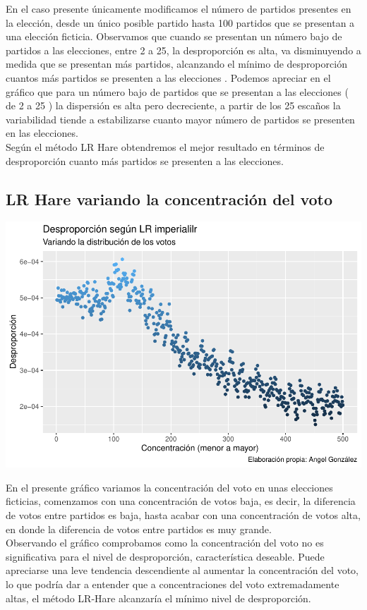 \documentclass[12pt,a4paper,]{book}
\numberwithin{dummy}{section}
\theoremstyle{ocrenumbox}
\theoremstyle{blacknumex}
\theoremstyle{blacknumbox}
\theoremstyle{ocrenum}
\theoremstyle{ocrenum}
\begin{document}
En el caso presente únicamente modificamos el número de partidos
presentes en la elección, desde un único posible partido hasta 100
partidos que se presentan a una elección ficticia. Observamos que cuando
se presentan un número bajo de partidos a las elecciones, entre 2 a 25,
la desproporción es alta, va disminuyendo a medida que se presentan más
partidos, alcanzando el mínimo de desproporción cuantos más partidos se
presenten a las elecciones . Podemos apreciar en el gráfico que para un
número bajo de partidos que se presentan a las elecciones ( de 2 a 25 )
la dispersión es alta pero decreciente, a partir de los 25 escaños la
variabilidad tiende a estabilizarse cuanto mayor número de partidos se
presenten en las elecciones.\\
Según el método LR Hare obtendremos el mejor resultado en términos de
desproporción cuanto más partidos se presenten a las elecciones.

\hypertarget{lr-hare-variando-la-concentraciuxf3n-del-voto}{%
\subsection{LR Hare variando la concentración del
voto}\label{lr-hare-variando-la-concentraciuxf3n-del-voto}}

\begin{center}\includegraphics[width=0.95\linewidth]{figurasR/unnamed-chunk-53-1} \end{center}

En el presente gráfico variamos la concentración del voto en unas
elecciones ficticias, comenzamos con una concentración de votos baja, es
decir, la diferencia de votos entre partidos es baja, hasta acabar con
una concentración de votos alta, en donde la diferencia de votos entre
partidos es muy grande.\\
Observando el gráfico comprobamos como la concentración del voto no es
significativa para el nivel de desproporción, característica deseable.
Puede apreciarse una leve tendencia descendiente al aumentar la
concentración del voto, lo que podría dar a entender que a
concentraciones del voto extremadamente altas, el método LR-Hare
alcanzaría el mínimo nivel de desproporción.
\end{document}
